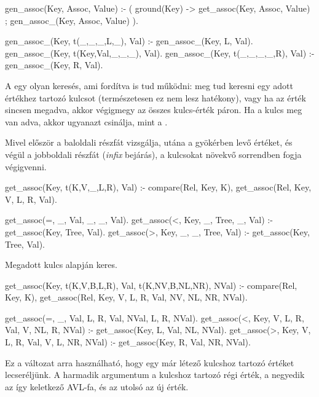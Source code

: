 \begin{program*}
gen_assoc(Key, Assoc, Value) :-
    (   ground(Key)
    ->  get_assoc(Key, Assoc, Value)
    ;   gen_assoc_(Key, Assoc, Value)
    ).

gen_assoc_(Key, t(_,_,_,L,_), Val) :-
    gen_assoc_(Key, L, Val).
gen_assoc_(Key, t(Key,Val,_,_,_), Val).
gen_assoc_(Key, t(_,_,_,_,R), Val) :-
    gen_assoc_(Key, R, Val).
\end{program*}
A  egy olyan keresés, ami fordítva is
tud működni: meg tud keresni egy adott értékhez
tartozó kulcsot (természetesen ez nem lesz
hatékony), vagy ha az érték sincsen megadva, akkor
végigmegy az összes kulcs-érték páron. Ha a kulcs
meg van adva, akkor ugyanazt csinálja, mint a
.

Mivel először a baloldali részfát vizsgálja, utána a
gyökérben levő értéket, és végül a jobboldali
részfát (\emph{infix} bejárás), a kulcsokat növekvő
sorrendben fogja végigvenni.

\begin{program*}
get_assoc(Key, t(K,V,_,L,R), Val) :-
    compare(Rel, Key, K),
    get_assoc(Rel, Key, V, L, R, Val).

get_assoc(=, _, Val, _, _, Val).
get_assoc(<, Key, _, Tree, _, Val) :-
    get_assoc(Key, Tree, Val).
get_assoc(>, Key, _, _, Tree, Val) :-
    get_assoc(Key, Tree, Val).
\end{program*}
Megadott kulcs alapján keres.
\begin{program*}
get_assoc(Key, t(K,V,B,L,R), Val,
          t(K,NV,B,NL,NR), NVal) :-
    compare(Rel, Key, K),
    get_assoc(Rel, Key, V, L, R, Val,
              NV, NL, NR, NVal).

get_assoc(=, _, Val, L, R, Val, NVal, L, R, NVal).
get_assoc(<, Key, V, L, R, Val, V, NL, R, NVal) :-
    get_assoc(Key, L, Val, NL, NVal).
get_assoc(>, Key, V, L, R, Val, V, L, NR, NVal) :-
    get_assoc(Key, R, Val, NR, NVal).
\end{program*}
Ez a változat arra használható, hogy egy már létező
kulcshoz tartozó értéket lecseréljünk. A harmadik
argumentum a kulcshoz tartozó régi érték, a negyedik
az így keletkező AVL-fa, és az utolsó az új érték.

